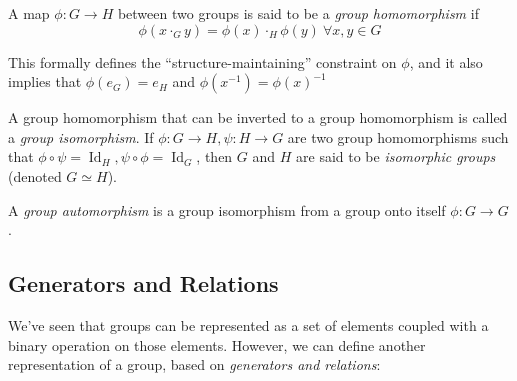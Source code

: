 \begin{definition}
  A map $\phi: G \to H$ between two groups is said to be a \emph{group homomorphism} if 
  \[
    \phi(x \cdot_G y) = \phi(x) \cdot_H \phi(y) \ \forall x, y \in G
  \]
\end{definition}

This formally defines the ``structure-maintaining'' constraint on $\phi$, and it also implies that $\phi(e_G) = e_H$ and $\phi(x^{-1}) = \phi(x)^{-1}$

\begin{definition}
  A group homomorphism that can be inverted to a group homomorphism is called a \emph{group isomorphism}. If $\phi: G \to H, \psi: H \to G$ are two group homomorphisms such that $\phi \circ \psi = \operatorname{Id}_H, \psi \circ \phi = \operatorname{Id}_G$, then $G$ and $H$ are said to be \emph{isomorphic groups} (denoted $G \simeq H$).
\end{definition}

\begin{definition}
  A \emph{group automorphism} is a group isomorphism from a group onto itself $\phi: G \to G$.
\end{definition}


\subsection{Generators and Relations}

We've seen that groups can be represented as a set of elements coupled with a binary operation on those elements. However, we can define another representation of a group, based on \emph{generators and relations}: 

